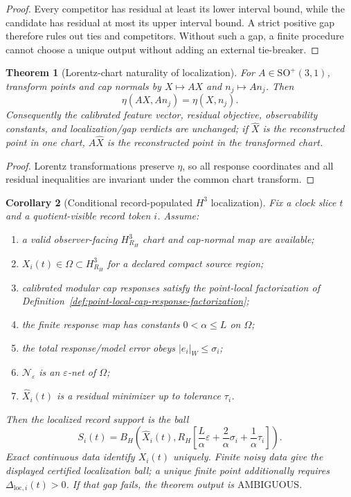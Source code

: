 \documentclass[11pt]{article}
\newtheorem{theorem}{Theorem}[section]
\newtheorem{corollary}[theorem]{Corollary}
\begin{document}
\begin{proof}
Every competitor has residual at least its lower interval bound, while the
candidate has residual at most its upper interval bound. A strict positive gap
therefore rules out ties and competitors. Without such a gap, a finite
procedure cannot choose a unique output without adding an external tie-breaker.
\end{proof}

\begin{theorem}[Lorentz-chart naturality of localization]\label{thm:h3-localization-naturality}
For \(A\in\mathrm{SO}^+(3,1)\), transform points and cap normals by
\(X\mapsto AX\) and \(n_j\mapsto An_j\). Then
\[
\eta(AX,An_j)=\eta(X,n_j).
\]
Consequently the calibrated feature vector, residual objective, observability
constants, and localization/gap verdicts are unchanged; if \(\widehat X\) is
the reconstructed point in one chart, \(A\widehat X\) is the reconstructed
point in the transformed chart.
\end{theorem}

\begin{proof}
Lorentz transformations preserve \(\eta\), so all response coordinates and all
residual inequalities are invariant under the common chart transform.
\end{proof}

\begin{corollary}[Conditional record-populated \(H^3\) localization]
\label{cor:conditional-record-populated-h3}
Fix a clock slice \(t\) and a quotient-visible record token \(i\). Assume:
\begin{enumerate}[leftmargin=2em]
\item a valid observer-facing \(H^3_{R_H}\) chart and cap-normal map are
available;
\item \(X_i(t)\in\Omega\subset H^3_{R_H}\) for a declared compact source
region;
\item calibrated modular cap responses satisfy the point-local factorization
of Definition~\ref{def:point-local-cap-response-factorization};
\item the finite response map has constants \(0<\alpha\leq L\) on \(\Omega\);
\item the total response/model error obeys \(|e_i|_W\leq\sigma_i\);
\item \(\mathcal N_\varepsilon\) is an \(\varepsilon\)-net of \(\Omega\);
\item \(\widehat X_i(t)\) is a residual minimizer up to tolerance \(\tau_i\).
\end{enumerate}
Then the localized record support is the ball
\[
S_i(t)=B_H\!\left(\widehat X_i(t),
R_H\left[
\frac L\alpha\varepsilon+\frac2\alpha\sigma_i+\frac1\alpha\tau_i
\right]\right).
\]
Exact continuous data identify \(X_i(t)\) uniquely. Finite noisy data give the
displayed certified localization ball; a unique finite point additionally
requires \(\Delta_{\mathrm{loc},i}(t)>0\). If that gap fails, the theorem output
is \(\mathrm{AMBIGUOUS}\).
\end{corollary}
\end{document}
